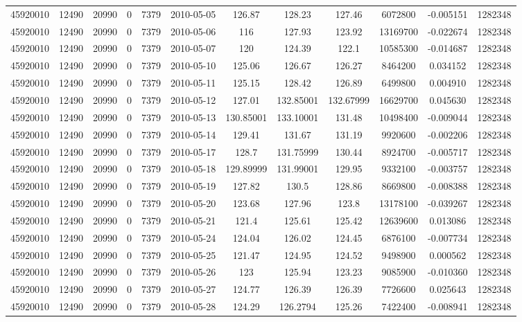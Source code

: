 \documentclass[12 pt]{article}
\begin{document}
\begin{flushleft}
\begin{table}[h]
\begin{tabular}{c c c c c c c c c c c c }
45920010 & 12490 & 20990 & 0 & 7379 & 2010-05-05 & 126.87 & 128.23 & 127.46 & 6072800 & -0.005151 & 1282348\\
45920010 & 12490 & 20990 & 0 & 7379 & 2010-05-06 & 116 & 127.93 & 123.92 & 13169700 & -0.022674 & 1282348\\
45920010 & 12490 & 20990 & 0 & 7379 & 2010-05-07 & 120 & 124.39 & 122.1 & 10585300 & -0.014687 & 1282348\\
45920010 & 12490 & 20990 & 0 & 7379 & 2010-05-10 & 125.06 & 126.67 & 126.27 & 8464200 & 0.034152 & 1282348\\
45920010 & 12490 & 20990 & 0 & 7379 & 2010-05-11 & 125.15 & 128.42 & 126.89 & 6499800 & 0.004910 & 1282348\\
45920010 & 12490 & 20990 & 0 & 7379 & 2010-05-12 & 127.01 & 132.85001 & 132.67999 & 16629700 & 0.045630 & 1282348\\
45920010 & 12490 & 20990 & 0 & 7379 & 2010-05-13 & 130.85001 & 133.10001 & 131.48 & 10498400 & -0.009044 & 1282348\\
45920010 & 12490 & 20990 & 0 & 7379 & 2010-05-14 & 129.41 & 131.67 & 131.19 & 9920600 & -0.002206 & 1282348\\
45920010 & 12490 & 20990 & 0 & 7379 & 2010-05-17 & 128.7 & 131.75999 & 130.44 & 8924700 & -0.005717 & 1282348\\
45920010 & 12490 & 20990 & 0 & 7379 & 2010-05-18 & 129.89999 & 131.99001 & 129.95 & 9332100 & -0.003757 & 1282348\\
45920010 & 12490 & 20990 & 0 & 7379 & 2010-05-19 & 127.82 & 130.5 & 128.86 & 8669800 & -0.008388 & 1282348\\
45920010 & 12490 & 20990 & 0 & 7379 & 2010-05-20 & 123.68 & 127.96 & 123.8 & 13178100 & -0.039267 & 1282348\\
45920010 & 12490 & 20990 & 0 & 7379 & 2010-05-21 & 121.4 & 125.61 & 125.42 & 12639600 & 0.013086 & 1282348\\
45920010 & 12490 & 20990 & 0 & 7379 & 2010-05-24 & 124.04 & 126.02 & 124.45 & 6876100 & -0.007734 & 1282348\\
45920010 & 12490 & 20990 & 0 & 7379 & 2010-05-25 & 121.47 & 124.95 & 124.52 & 9498900 & 0.000562 & 1282348\\
45920010 & 12490 & 20990 & 0 & 7379 & 2010-05-26 & 123 & 125.94 & 123.23 & 9085900 & -0.010360 & 1282348\\
45920010 & 12490 & 20990 & 0 & 7379 & 2010-05-27 & 124.77 & 126.39 & 126.39 & 7726600 & 0.025643 & 1282348\\
45920010 & 12490 & 20990 & 0 & 7379 & 2010-05-28 & 124.29 & 126.2794 & 125.26 & 7422400 & -0.008941 & 1282348\\

\end{tabular}
\end{table}
\end{flushleft}
\end{document}
